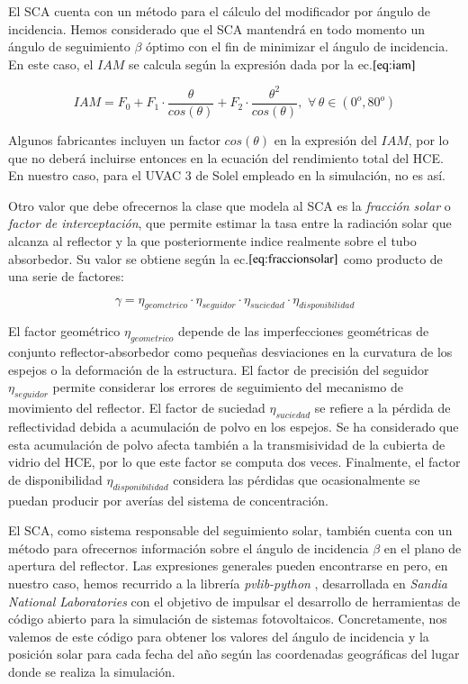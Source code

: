 El SCA cuenta con un método para el cálculo del modificador por ángulo de incidencia. Hemos considerado que el SCA mantendrá en todo momento un ángulo de seguimiento \(\beta\) óptimo con el fin de minimizar el ángulo de incidencia. En este caso, el \(IAM\) se calcula según la expresión dada por la ec.\(\eqref{eq:iam}\)

\begin{equation}
   IAM = F_0 + F_1 \cdot \frac{\theta}{cos(\theta)} + F_2 \cdot \frac{\theta^2}{cos(\theta)},\,\, \forall  \,
 \theta \in (0^o, 80^o)
    \label{eq:iam}
\end{equation}

Algunos fabricantes incluyen un factor \(cos(\theta)\) en la expresión del \(IAM\), por lo que no deberá incluirse entonces en la ecuación del rendimiento total del HCE. En nuestro caso, para el UVAC 3 de Solel empleado en la simulación, no es así.

Otro valor que debe ofrecernos la clase que modela al SCA es la \textit{fracción solar} o \textit{factor de interceptación}, que permite estimar la tasa entre la radiación solar que alcanza al reflector y la que posteriormente indice realmente sobre el tubo absorbedor. Su valor se obtiene según la ec.\(\eqref{eq:fraccionsolar}\) como producto de una serie de factores: 

\begin{equation}
   \gamma = \eta_{geometrico} \cdot \eta_{seguidor} \cdot \eta_{suciedad} \cdot \eta_{disponibilidad}
    \label{eq:fraccionsolar}
\end{equation}

El factor geométrico \(\eta_{geometrico}\) depende de las imperfecciones geométricas de conjunto reflector-absorbedor como pequeñas desviaciones en la curvatura de los espejos o la deformación de la estructura. El factor de precisión del seguidor \(\eta_{seguidor}\) permite considerar los errores de seguimiento del mecanismo de movimiento del reflector. El factor de suciedad \(\eta_{suciedad}\) se refiere a la pérdida de reflectividad debida a acumulación de polvo en los espejos. Se ha considerado que esta acumulación de polvo afecta también a la transmisividad de la cubierta de vidrio del HCE, por lo que este factor se computa dos veces. Finalmente, el factor de disponibilidad \(\eta_{disponibilidad}\) considera las pérdidas que ocasionalmente se puedan producir por averías del sistema de concentración.

El SCA, como sistema responsable del seguimiento solar, también cuenta con un método para ofrecernos información sobre el ángulo de incidencia \(\beta\) en el plano de apertura del reflector. Las expresiones generales pueden encontrarse en \cite{duffieSolarEngineeringThermal2006} pero, en nuestro caso, hemos recurrido a la librería \emph{pvlib-python}  \cite{holmgrenPvlibPythonPython2018}, desarrollada en \emph{Sandia National Laboratories} con el objetivo de impulsar el desarrollo de herramientas de código abierto para la simulación de sistemas fotovoltaicos. Concretamente, nos valemos de este código para obtener los valores del ángulo de incidencia y la posición solar para cada fecha del año según las coordenadas geográficas del lugar donde se realiza la simulación.

